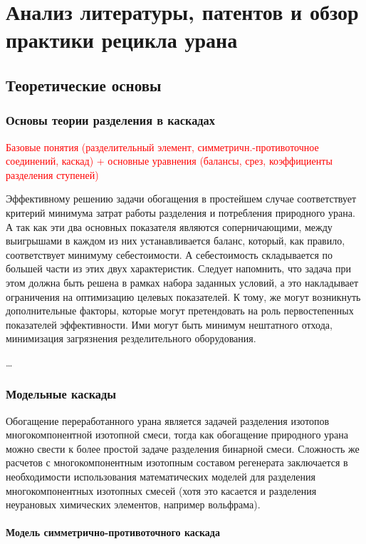 \chapter{Анализ литературы, патентов и обзор практики рецикла урана}\label{ch:ch1}

\section{Теоретические основы}

\subsection{Основы теории разделения в каскадах}
\textcolor{red}{Базовые понятия (разделительный элемент, симметричн.-противоточное соединений, каскад) + основные уравнения (балансы, срез, коэффициенты разделения ступеней)}

Эффективному решению задачи обогащения в простейшем случае соответствует критерий минимума затрат работы разделения и потребления природного урана.
А так как эти два основных показателя являются соперничающими, между выигрышами в каждом из них устанавливается баланс, который, как правило, соответствует минимуму себестоимости.
А себестоимость складывается по большей части из этих двух характеристик.
Следует напомнить, что задача при этом должна быть решена в рамках набора заданных условий, а это накладывает ограничения на оптимизацию целевых показателей.
К тому, же могут возникнуть дополнительные факторы, которые могут претендовать на роль первостепенных показателей эффективности.
Ими могут быть минимум нештатного отхода, минимизация загрязнения резделительного оборудования.

\dots

\subsection{Модельные каскады}

Обогащение переработанного урана является задачей разделения изотопов многокомпонентной изотопной смеси, тогда как обогащение природного урана можно свести к более простой задаче разделения бинарной смеси.
Сложность же расчетов с многокомпонентным изотопным составом регенерата заключается в необходимости использования математических моделей для разделения многокомпонентных изотопных смесей (хотя это касается и разделения неурановых химических элементов, например вольфрама).

\subsubsection{Модель симметрично-противоточного каскада}

